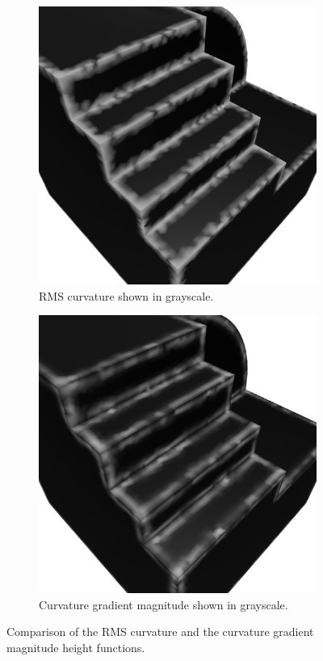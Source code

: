 \begin{figure}[htb]
	\centering
	\begin{subfigure}[t]{0.42\textwidth}
		\centering
		\includegraphics[width=\linewidth]{../resources/curvature/m7120369_rmsk.png}
		\caption{RMS curvature shown in grayscale.}
		\label{sfig:m7_rmsk}
	\end{subfigure}
	\hfill
	\begin{subfigure}[t]{0.42\textwidth}
		\centering
		\includegraphics[width=\linewidth]{../resources/curvature/m7120369_gradk.png}
		\caption{Curvature gradient magnitude shown in grayscale.}
		\label{sfig:m7_gradk}
	\end{subfigure}
	\caption{Comparison of the RMS curvature and the curvature gradient magnitude height functions.}
\end{figure}

